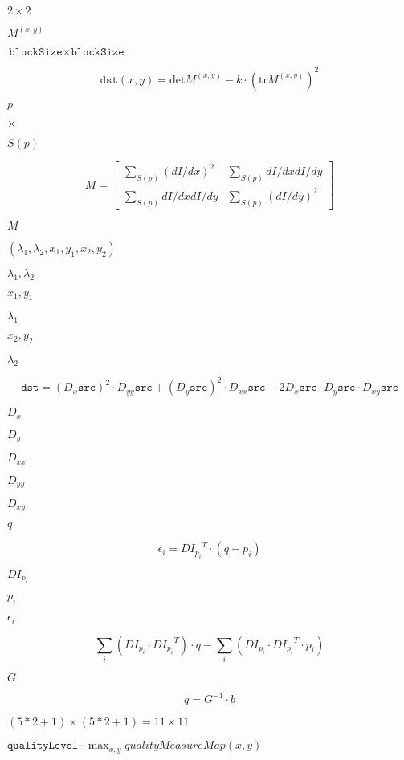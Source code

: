 \documentclass{article}
\begin{document}
$2\times2$
\pagebreak

$M^{(x,y)}$
\pagebreak

$\texttt{blockSize} \times \texttt{blockSize}$
\pagebreak

\[\texttt{dst} (x,y) = \mathrm{det} M^{(x,y)} - k \cdot \left ( \mathrm{tr} M^{(x,y)} \right )^2\]
\pagebreak

$p$
\pagebreak

$\times$
\pagebreak

$S(p)$
\pagebreak

\[M = \begin{bmatrix} \sum _{S(p)}(dI/dx)^2 & \sum _{S(p)}dI/dx dI/dy \\ \sum _{S(p)}dI/dx dI/dy & \sum _{S(p)}(dI/dy)^2 \end{bmatrix}\]
\pagebreak

$M$
\pagebreak

$(\lambda_1, \lambda_2, x_1, y_1, x_2, y_2)$
\pagebreak

$\lambda_1, \lambda_2$
\pagebreak

$x_1, y_1$
\pagebreak

$\lambda_1$
\pagebreak

$x_2, y_2$
\pagebreak

$\lambda_2$
\pagebreak

\[\texttt{dst} = (D_x \texttt{src} )^2 \cdot D_{yy} \texttt{src} + (D_y \texttt{src} )^2 \cdot D_{xx} \texttt{src} - 2 D_x \texttt{src} \cdot D_y \texttt{src} \cdot D_{xy} \texttt{src}\]
\pagebreak

$D_x$
\pagebreak

$D_y$
\pagebreak

$D_{xx}$
\pagebreak

$D_{yy}$
\pagebreak

$D_{xy}$
\pagebreak

$q$
\pagebreak

\[\epsilon _i = {DI_{p_i}}^T \cdot (q - p_i)\]
\pagebreak

${DI_{p_i}}$
\pagebreak

$p_i$
\pagebreak

$\epsilon_i$
\pagebreak

\[\sum _i(DI_{p_i} \cdot {DI_{p_i}}^T) \cdot q - \sum _i(DI_{p_i} \cdot {DI_{p_i}}^T \cdot p_i)\]
\pagebreak

$G$
\pagebreak

\[q = G^{-1} \cdot b\]
\pagebreak

$(5*2+1) \times (5*2+1) = 11 \times 11$
\pagebreak

$\texttt{qualityLevel} \cdot \max_{x,y} qualityMeasureMap(x,y)$
\pagebreak
\end{document}
